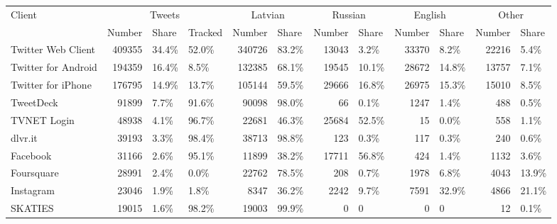 \begin{tabular}{lrllrlrlrlrl}
\toprule
\multirow{2}{*}{Client} & \multicolumn{3}{c}{Tweets} & \multicolumn{2}{c}{Latvian} & \multicolumn{2}{c}{Russian} & \multicolumn{2}{c}{English} & \multicolumn{2}{c}{Other} \\
\cmidrule(r){2-4} \cmidrule(r){5-6} \cmidrule(r){7-8} \cmidrule(r){9-10} \cmidrule(r){11-12}
{} &  Number & Share & Tracked & Number & Share & Number & Share & Number & Share & Number & Share \\
\midrule
Twitter Web Client  &      409355 &       34.4\% &                52.0\% &            340726 &             83.2\% &             13043 &              3.2\% &             33370 &              8.2\% &            22216 &             5.4\% \\
Twitter for Android &      194359 &       16.4\% &                 8.5\% &            132385 &             68.1\% &             19545 &             10.1\% &             28672 &             14.8\% &            13757 &             7.1\% \\
Twitter for iPhone  &      176795 &       14.9\% &                13.7\% &            105144 &             59.5\% &             29666 &             16.8\% &             26975 &             15.3\% &            15010 &             8.5\% \\
TweetDeck           &       91899 &        7.7\% &                91.6\% &             90098 &             98.0\% &                66 &              0.1\% &              1247 &              1.4\% &              488 &             0.5\% \\
TVNET Login         &       48938 &        4.1\% &                96.7\% &             22681 &             46.3\% &             25684 &             52.5\% &                15 &              0.0\% &              558 &             1.1\% \\
dlvr.it             &       39193 &        3.3\% &                98.4\% &             38713 &             98.8\% &               123 &              0.3\% &               117 &              0.3\% &              240 &             0.6\% \\
Facebook            &       31166 &        2.6\% &                95.1\% &             11899 &             38.2\% &             17711 &             56.8\% &               424 &              1.4\% &             1132 &             3.6\% \\
Foursquare          &       28991 &        2.4\% &                 0.0\% &             22762 &             78.5\% &               208 &              0.7\% &              1978 &              6.8\% &             4043 &            13.9\% \\
Instagram           &       23046 &        1.9\% &                 1.8\% &              8347 &             36.2\% &              2242 &              9.7\% &              7591 &             32.9\% &             4866 &            21.1\% \\
SKATIES             &       19015 &        1.6\% &                98.2\% &             19003 &             99.9\% &                 0 &                 0 &                 0 &                 0 &               12 &             0.1\% \\
\bottomrule
\end{tabular}
